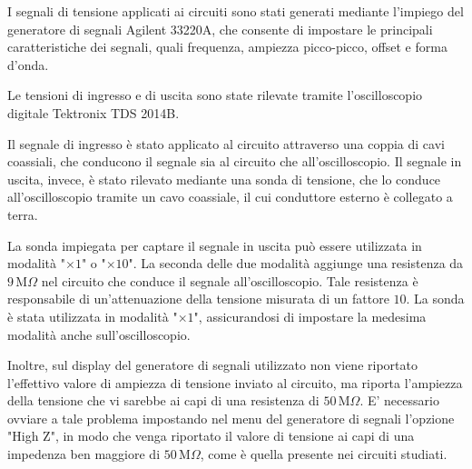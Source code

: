 \documentclass[a4paper,12pt]{article}
\begin{document}
I segnali di tensione applicati ai circuiti sono stati generati mediante l'impiego del generatore di segnali Agilent 33220A, che consente di impostare le principali caratteristiche dei segnali, quali frequenza, ampiezza picco-picco, offset e forma d’onda.

Le tensioni di ingresso e di uscita sono state rilevate tramite l’oscilloscopio digitale Tektronix TDS 2014B.

Il segnale di ingresso è stato applicato al circuito attraverso una coppia di cavi coassiali, che conducono il segnale sia al circuito che all’oscilloscopio. Il segnale in uscita, invece, è stato rilevato mediante una sonda di tensione, che lo conduce all’oscilloscopio tramite un cavo coassiale, il cui conduttore esterno è collegato a terra.

La sonda impiegata per captare il segnale in uscita può essere utilizzata in modalità "$\times 1$" o "$\times 10$". 
La seconda delle due modalità aggiunge una resistenza da $9\,\mathrm{M}\Omega$ nel circuito che conduce il segnale all'oscilloscopio. Tale resistenza è responsabile di un'attenuazione della tensione misurata di un fattore $10$.
La sonda è stata utilizzata in modalità "$\times 1$", assicurandosi di impostare la medesima modalità anche sull'oscilloscopio.

Inoltre, sul display del generatore di segnali utilizzato non viene riportato l'effettivo valore di ampiezza di tensione inviato al circuito, ma riporta l'ampiezza della tensione che vi sarebbe ai capi di una resistenza di $50\,\mathrm{M}\Omega$. E' necessario ovviare a tale problema impostando nel menu del generatore di segnali l'opzione "High $\mathrm{Z}$", in modo che venga riportato il valore di tensione ai capi di una impedenza ben maggiore di $50\,\mathrm{M}\Omega$, come è quella presente nei circuiti studiati.
\end{document}
